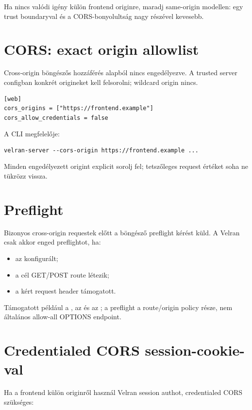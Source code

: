 Ha nincs valódi igény külön frontend originre, maradj same-origin modellen: egy trust boundaryval és a CORS-bonyolultság nagy részével kevesebb.

\section{CORS: exact origin allowlist}

Cross-origin böngészős hozzáférés alapból nincs engedélyezve. A trusted server configban konkrét origineket kell felsorolni; wildcard origin nincs.

\begin{lstlisting}
[web]
cors_origins = ["https://frontend.example"]
cors_allow_credentials = false
\end{lstlisting}

A CLI megfelelője:

\begin{lstlisting}
velran-server --cors-origin https://frontend.example ...
\end{lstlisting}

Minden engedélyezett origint explicit sorolj fel; tetszőleges request  értéket soha ne tükrözz vissza.

\section{Preflight}

Bizonyos cross-origin requestek előtt a böngésző  preflight kérést küld. A Velran csak akkor enged preflightot, ha:

\begin{itemize}
  \item az  konfigurált;
  \item a cél GET/POST route létezik;
  \item a kért request header támogatott.
\end{itemize}

Támogatott például a , az  és az ; a preflight a route/origin policy része, nem általános allow-all OPTIONS endpoint.

\section{Credentialed CORS session-cookie-val}

Ha a frontend külön originről használ Velran session authot, credentialed CORS szükséges:

